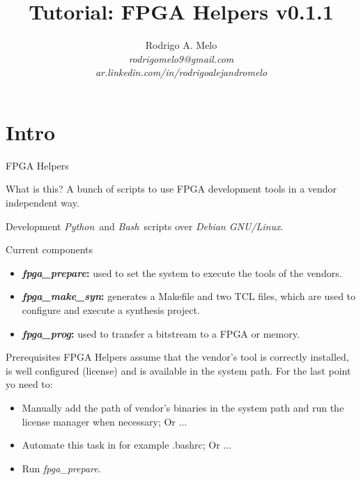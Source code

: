 \documentclass{beamer}
\title[FPGA Helpers]{Tutorial: FPGA Helpers v0.1.1}
\author{
  Rodrigo A. Melo\\
  \textit{rodrigomelo9@gmail.com}\\
  \textit{ar.linkedin.com/in/rodrigoalejandromelo}
}
\newcommand{\python}         {\textit{Python}}
\newcommand{\bash}           {\textit{Bash}}
\newcommand{\debian}         {\textit{Debian GNU/Linux}}
\newcommand{\fpgaprepare}    {\textit{fpga\_prepare}}
\newcommand{\fpgamakesyn}    {\textit{fpga\_make\_syn}}
\newcommand{\fpgaprog}       {\textit{fpga\_prog}}
\begin{document}
\begin{frame}
  \titlepage
\end{frame}

\section{Intro}

\begin{frame}{FPGA Helpers}
  \begin{exampleblock}{What is this?}
    A bunch of scripts to use FPGA development tools in a vendor independent way.
  \end{exampleblock}
  \begin{block}{Development}
    \python\ and \bash\ scripts over \debian.
  \end{block}
\end{frame}

\begin{frame}{Current components}
  \begin{itemize}
    \item \textbf{\fpgaprepare:} used to set the system to execute the tools of the vendors.
    \item \textbf{\fpgamakesyn:} generates a Makefile and two TCL files, which are used to
          configure and execute a synthesis project.
    \item \textbf{\fpgaprog:} used to transfer a bitstream to a FPGA or memory.
  \end{itemize}
\end{frame}

\begin{frame}{Prerequisites}
  FPGA Helpers assume that the vendor's tool is correctly installed, is well configured (license)
  and is available in the system path. For the last point yo need to:
  \begin{itemize}
    \item Manually add the path of vendor's binaries in the system path and run the license
          manager when necessary; Or ...
    \item Automate this task in for example .bashrc; Or ...
    \item Run \fpgaprepare.
  \end{itemize}
\end{frame}
\end{document}
